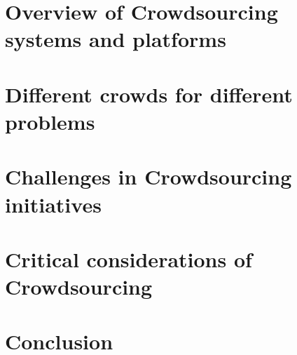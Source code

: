 \documentclass{sig-alternate}
\begin{document}
\section{Overview of Crowdsourcing systems and platforms}

\section{Different crowds for different problems}

\section{Challenges in Crowdsourcing initiatives}

\section{Critical considerations of Crowdsourcing}
%

\section{Conclusion}

\nocite{*}


\end{document}
